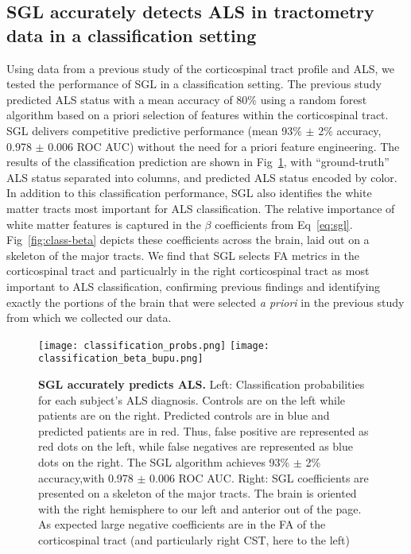 \subsection*{SGL accurately detects ALS in tractometry data in a classification setting}

Using data from a previous study of the corticospinal tract profile and
ALS\cite{sarica2017corticospinal}, we tested the performance of SGL in a
classification setting. The previous study predicted ALS status with a mean
accuracy of 80\% using a random forest algorithm based on a priori selection of
features within the corticospinal tract. SGL delivers competitive predictive
performance (mean 93\% $\pm$ 2\% accuracy, 0.978 $\pm$ 0.006 ROC AUC) without
the need for a priori feature engineering. The results of the classification
prediction are shown in Fig~\ref{fig:class-results}, with ``ground-truth'' ALS
status separated into columns, and predicted ALS status encoded by color. In
addition to this classification performance, SGL also identifies the white
matter tracts most important for ALS classification. The relative importance of
white matter features is captured in the $\beta$ coefficients from
Eq~\eqref{eq:sgl}. Fig~\ref{fig:class-beta} depicts these coefficients across
the brain, laid out on a skeleton of the major tracts. We find that SGL selects
FA metrics in the corticospinal tract and particualrly in the right
corticospinal tract as most important to ALS classification, confirming previous
findings\cite{van2011upper, toosy2003diffusion, sarica2014tractography,
sage2007quantitative, sage2009quantitative, karlsborg2004corticospinal,
ellis1999diffusion, cosottini2005diffusion, ciccarelli2009investigation,
abe2010voxel} and identifying exactly the portions of the brain that were
selected \emph{a priori} in the previous study from which we collected our
data\cite{sarica2017corticospinal}.

\begin{figure}[!h]
    \centering
    \texttt{[image: classification\_probs.png]}
    \texttt{[image: classification\_beta\_bupu.png]}

    \caption{{\bf SGL accurately predicts ALS.}
        Left: Classification probabilities for each subject's ALS diagnosis.
        Controls are on the left while patients are on the right. Predicted
        controls are in blue and predicted patients are in red. Thus, false
        positive are represented as red dots on the left, while false negatives
        are represented as blue dots on the right. The SGL algorithm achieves
        93\% $\pm$ 2\% accuracy,with 0.978 $\pm$ 0.006 ROC AUC. Right: SGL
        coefficients are presented on a skeleton of the major tracts. The brain
        is oriented with the right hemisphere to our left and anterior out of
        the page. As expected large negative coefficients are in the FA of the
        corticospinal tract (and particularly right CST, here to the left)}
    \label{fig:class-results}
\end{figure}


